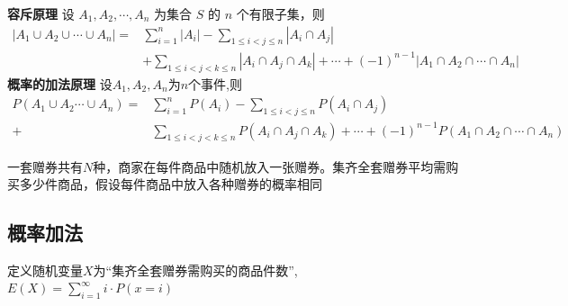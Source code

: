 \documentclass[10t, a4paper, oneside]{ctexbook}
\begin{document}
\textbf{容斥原理}
设 $A_1,A_2,\cdots,A_n$ 为集合 $S$ 的 $n$ 个有限子集，则
$$\begin{aligned}
    \left|A_{1}\cup A_{2}\cup\cdots\cup A_{n}\right|=&\sum_{i=1}^{n}\left|A_{i}\right|-\sum_{1\le i<j\le n}\left|A_{i}\cap A_{j}\right|\\
    &+\sum_{1\leq i<j<k\leq n}\left|A_{i}\cap A_{j}\cap A_{k}\right|+\cdots+(-1)^{n-1}\left|A_{1}\cap A_{2}\cap\cdots\cap A_{n}\right|
\end{aligned}$$
\textbf{概率的加法原理}
设$A_1, A_2,A_n$为$n$个事件,则
$$\begin{aligned}P(A_1\cup A_2 \cdots \cup A_n) = &\sum_{i = 1}^n P(A_i) - \sum_{1 \le i < j \le n}P(A_i \cap A_j) \\
    +& \sum_{1 \le i< j < k\le n}P(A_i \cap A_j \cap A_k) + \cdots + (-1)^{n-1}P(A_1\cap A_2 \cap \cdots \cap A_n)\end{aligned}$$

一套赠券共有$N$种，商家在每件商品中随机放入一张赠券。集齐全套赠券平均需购买多少件商品，假设每件商品中放入各种赠券的概率相同

\subsection{概率加法}
定义随机变量$X$为“集齐全套赠券需购买的商品件数”,$E(X) = \sum_{i = 1}^{\infty} i \cdot P(x = i)$
\end{document}
